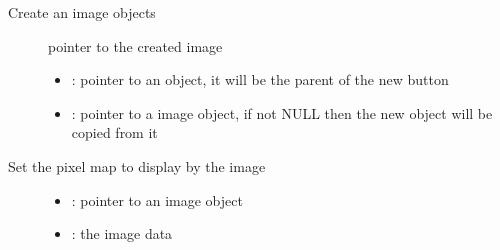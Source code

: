 \documentclass[letterpaper,10pt,english]{sphinxmanual}
\begin{document}
\begin{fulllineitems}
\label{\detokenize{object-types/img:_CPPv413lv_img_createP8lv_obj_tPK8lv_obj_t}}%
\pysigstartmultiline
{}\label{\detokenize{object-types/img:lv__img_8h_1afa626a67d3e94e4e29061072d1771fe4}}%
\pysigstopmultiline
Create an image objects \begin{description}
\item[{}] \leavevmode
pointer to the created image 

\item[{}] \leavevmode\begin{itemize}
\item {} 
: pointer to an object, it will be the parent of the new button 

\item {} 
: pointer to a image object, if not NULL then the new object will be copied from it 

\end{itemize}

\end{description}


\end{fulllineitems}


\begin{fulllineitems}
\label{\detokenize{object-types/img:_CPPv414lv_img_set_srcP8lv_obj_tPKv}}%
\pysigstartmultiline
{}\label{\detokenize{object-types/img:lv__img_8h_1a23bf746ecc223710e27625c574cc989e}}%
\pysigstopmultiline
Set the pixel map to display by the image \begin{description}
\item[{}] \leavevmode\begin{itemize}
\item {} 
: pointer to an image object 

\item {} 
: the image data 

\end{itemize}

\end{description}


\end{fulllineitems}
\end{document}

